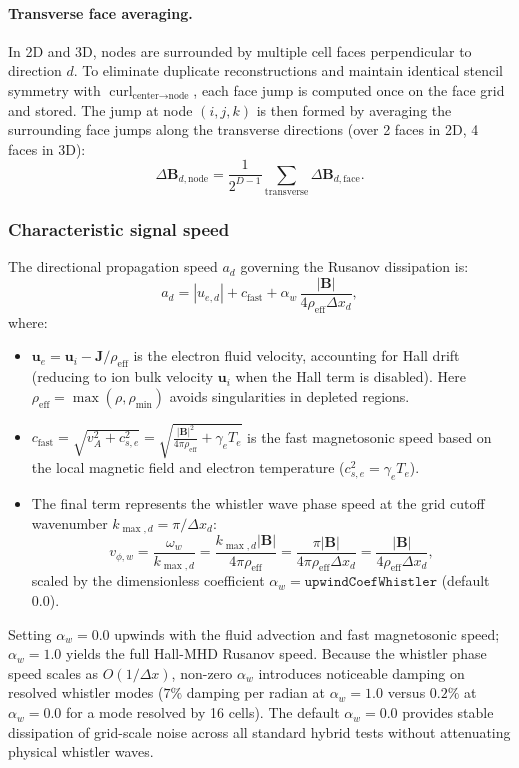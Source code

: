 \documentclass[a4paper, 11pt]{article}
\begin{document}
\paragraph{Transverse face averaging.}
In 2D and 3D, nodes are surrounded by multiple cell faces perpendicular to direction $d$. To eliminate duplicate reconstructions and maintain identical stencil symmetry with $\operatorname{curl}_{\text{center}\to\text{node}}$, each face jump is computed once on the face grid and stored. The jump at node $(i,j,k)$ is then formed by averaging the surrounding face jumps along the transverse directions (over 2 faces in 2D, 4 faces in 3D):
\begin{equation}
\Delta\mathbf{B}_{d, \text{node}} = \frac{1}{2^{D-1}} \sum_{\text{transverse}} \Delta\mathbf{B}_{d, \text{face}}.
\end{equation}

\subsubsection{Characteristic signal speed}

The directional propagation speed $a_d$ governing the Rusanov dissipation is:
\begin{equation}
a_d = |u_{e,d}| + c_{\text{fast}} + \alpha_w\,\frac{|\mathbf{B}|}{4\rho_{\text{eff}}\Delta x_d},
\label{eq:hybrid_upwind_speed}
\end{equation}
where:
\begin{itemize}
  \item $\mathbf{u}_e = \mathbf{u}_i - \mathbf{J}/\rho_{\text{eff}}$ is the electron fluid velocity, accounting for Hall drift (reducing to ion bulk velocity $\mathbf{u}_i$ when the Hall term is disabled). Here $\rho_{\text{eff}} = \max(\rho, \rho_{\min})$ avoids singularities in depleted regions.
  \item $c_{\text{fast}} = \sqrt{v_A^2 + c_{s,e}^2} = \sqrt{\frac{|\mathbf{B}|^2}{4\pi\rho_{\text{eff}}} + \gamma_e T_e}$ is the fast magnetosonic speed based on the local magnetic field and electron temperature ($c_{s,e}^2 = \gamma_e T_e$).
  \item The final term represents the whistler wave phase speed at the grid cutoff wavenumber $k_{\max, d} = \pi / \Delta x_d$:
  \begin{equation}
  v_{\phi, w} = \frac{\omega_w}{k_{\max, d}} = \frac{k_{\max, d}|\mathbf{B}|}{4\pi\rho_{\text{eff}}} = \frac{\pi|\mathbf{B}|}{4\pi\rho_{\text{eff}}\Delta x_d} = \frac{|\mathbf{B}|}{4\rho_{\text{eff}}\Delta x_d},
  \end{equation}
  scaled by the dimensionless coefficient $\alpha_w = \texttt{upwindCoefWhistler}$ (default $0.0$).
\end{itemize}
Setting $\alpha_w = 0.0$ upwinds with the fluid advection and fast magnetosonic speed; $\alpha_w = 1.0$ yields the full Hall-MHD Rusanov speed. Because the whistler phase speed scales as $O(1/\Delta x)$, non-zero $\alpha_w$ introduces noticeable damping on resolved whistler modes ($7\%$ damping per radian at $\alpha_w = 1.0$ versus $0.2\%$ at $\alpha_w = 0.0$ for a mode resolved by 16 cells). The default $\alpha_w = 0.0$ provides stable dissipation of grid-scale noise across all standard hybrid tests without attenuating physical whistler waves.
\end{document}
